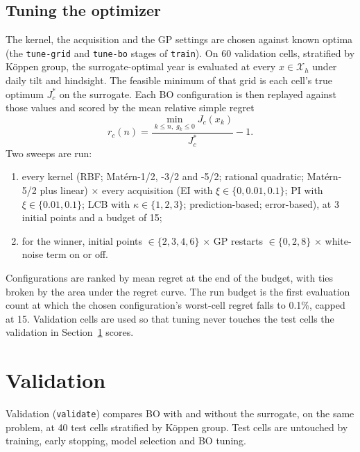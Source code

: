 \documentclass[11pt]{article}
\newcommand{\code}[1]{\texttt{#1}}
\begin{document}
\subsection{Tuning the optimizer}
\label{sec:tuning}

The kernel, the acquisition and the GP settings are chosen against known optima (the
\code{tune-grid} and \code{tune-bo} stages of \code{train}). On 60 validation cells,
stratified by K\"oppen group, the surrogate-optimal year is evaluated at every
$x \in \mathcal{X}_h$ under daily tilt and hindsight. The feasible minimum of that grid is
each cell's true optimum $J_c^\ast$ on the surrogate. Each BO configuration is then replayed
against those values and scored by the mean relative simple regret
\begin{equation}
r_c(n) = \frac{\min_{k \le n,\; g_k \le 0} J_c(x_k)}{J_c^\ast} - 1 .
\end{equation}
Two sweeps are run:
\begin{enumerate}
\item every kernel (RBF; Mat\'ern-1/2, -3/2 and -5/2; rational quadratic; Mat\'ern-5/2 plus
linear) $\times$ every acquisition (EI with $\xi \in \{0, 0.01, 0.1\}$; PI with
$\xi \in \{0.01, 0.1\}$; LCB with $\kappa \in \{1, 2, 3\}$; prediction-based; error-based),
at 3 initial points and a budget of 15;
\item for the winner, initial points $\in \{2,3,4,6\}$ $\times$ GP restarts
$\in \{0,2,8\}$ $\times$ white-noise term on or off.
\end{enumerate}
Configurations are ranked by mean regret at the end of the budget, with ties broken by the
area under the regret curve. The run budget is the first evaluation count at which the
chosen configuration's worst-cell regret falls to 0.1\%, capped at 15. Validation cells are used so
that tuning never touches the test cells the validation in Section~\ref{sec:validation}
scores.

\section{Validation}
\label{sec:validation}

Validation (\code{validate}) compares BO with and without the surrogate, on the same problem,
at 40 test cells stratified by K\"oppen group. Test cells are untouched by training, early
stopping, model selection and BO tuning.
\end{document}
